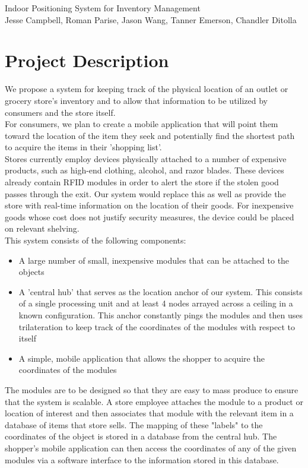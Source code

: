 \documentclass{article}
\begin{document}
\begin{center}
{\Large Indoor Positioning System for Inventory Management} \\
{\small Jesse Campbell, Roman Parise, Jason Wang, Tanner Emerson, Chandler Ditolla}
\end{center}
\section{Project Description}
We propose a system for keeping track of the physical location of an outlet or grocery store's inventory and to allow that information to be utilized by consumers and the store itself. \\

For consumers, we plan to create a mobile application that will point them toward the location of the item they seek and potentially find the shortest path to acquire the items in their 'shopping list'. \\

Stores currently employ devices physically attached to a number of expensive products, such as high-end clothing, alcohol, and razor blades. These devices already contain RFID modules in order to alert the store if the stolen good passes through the exit. Our system would replace this as well as provide the store with real-time information on the location of their goods. For inexpensive goods whose cost does not justify security measures, the device could be placed on relevant shelving.\\

This system consists of the following components:
\begin{itemize}
\item A large number of small, inexpensive modules that can be attached to the objects
\item A 'central hub' that serves as the location anchor of our system. This consists of a single processing unit and at least 4 nodes arrayed across a ceiling in a known configuration. This anchor constantly pings the modules and then uses trilateration to keep track of the coordinates of the modules with respect to itself
\item A simple, mobile application that allows the shopper to acquire the coordinates of the modules
\end{itemize}
The modules are to be designed so that they are easy to mass produce to ensure that the system is scalable.
A store employee attaches the module to a product or location of interest and then associates that module with the relevant item in a database of items that store sells.
The mapping of these "labels" to the coordinates of the object is stored in a database from the central hub.
The shopper's mobile application can then access the coordinates of any of the given modules via a software interface to the information stored in this database.
\end{document}
